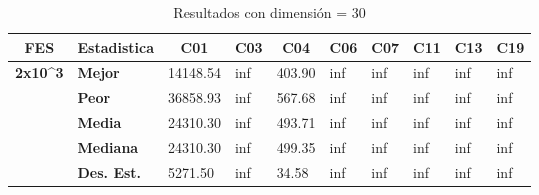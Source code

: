 \documentclass{article}
\begin{document}
\begin{table}[h!]
\centering
\caption{Resultados con dimensión = 30}
\label{dim30}
\begin{tabular}{|c|l|l|l|l|l|l|l|l|l|}
\hline
\textbf{FES}                                       & \multicolumn{1}{c|}{\textbf{Estadistica}} & \multicolumn{1}{c|}{\textbf{C01}} & \multicolumn{1}{c|}{\textbf{C03}} & \multicolumn{1}{c|}{\textbf{C04}} & \multicolumn{1}{c|}{\textbf{C06}} & \multicolumn{1}{c|}{\textbf{C07}} & \multicolumn{1}{c|}{\textbf{C11}} & \multicolumn{1}{c|}{\textbf{C13}} & \multicolumn{1}{c|}{\textbf{C19}} \\ \hline
\multirow{5}{*}{\textbf{2x10\textasciicircum{}3}}  & \textbf{Mejor}                            & 14148.54                          & inf                               & 403.90                            & inf                               & inf                               & inf                               & inf                               & inf                               \\ \cline{2-10} 
                                                   & \textbf{Peor}                             & 36858.93                          & inf                               & 567.68                            & inf                               & inf                               & inf                               & inf                               & inf                               \\ \cline{2-10} 
                                                   & \textbf{Media}                            & 24310.30                          & inf                               & 493.71                            & inf                               & inf                               & inf                               & inf                               & inf                               \\ \cline{2-10} 
                                                   & \textbf{Mediana}                          & 24310.30                          & inf                               & 499.35                            & inf                               & inf                               & inf                               & inf                               & inf                               \\ \cline{2-10} 
                                                   & \textbf{Des. Est.}                        & 5271.50                           & inf                               & 34.58                             & inf                               & inf                               & inf                               & inf                               & inf                               \\ \hline

\end{tabular}
\end{table}
\end{document}
